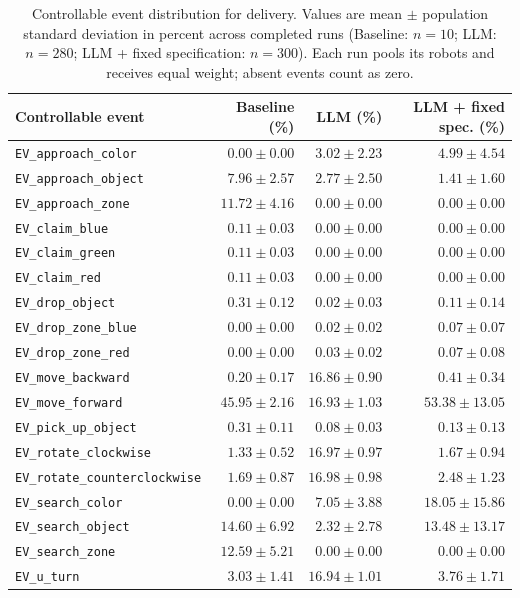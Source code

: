 \begin{table}[htbp]
\centering
\small
\caption{Controllable event distribution for delivery. Values are mean $\pm$ population standard deviation in percent across completed runs (Baseline: $n=10$; LLM: $n=280$; LLM + fixed specification: $n=300$). Each run pools its robots and receives equal weight; absent events count as zero.}
\label{tab:delivery-controllable-events}
\begin{tabular}{lrrr}
\hline
Controllable event & Baseline (\%) & LLM (\%) & LLM + fixed spec. (\%) \\
\hline
\texttt{EV\_approach\_color} & $0.00 \pm 0.00$ & $3.02 \pm 2.23$ & $4.99 \pm 4.54$ \\
\texttt{EV\_approach\_object} & $7.96 \pm 2.57$ & $2.77 \pm 2.50$ & $1.41 \pm 1.60$ \\
\texttt{EV\_approach\_zone} & $11.72 \pm 4.16$ & $0.00 \pm 0.00$ & $0.00 \pm 0.00$ \\
\texttt{EV\_claim\_blue} & $0.11 \pm 0.03$ & $0.00 \pm 0.00$ & $0.00 \pm 0.00$ \\
\texttt{EV\_claim\_green} & $0.11 \pm 0.03$ & $0.00 \pm 0.00$ & $0.00 \pm 0.00$ \\
\texttt{EV\_claim\_red} & $0.11 \pm 0.03$ & $0.00 \pm 0.00$ & $0.00 \pm 0.00$ \\
\texttt{EV\_drop\_object} & $0.31 \pm 0.12$ & $0.02 \pm 0.03$ & $0.11 \pm 0.14$ \\
\texttt{EV\_drop\_zone\_blue} & $0.00 \pm 0.00$ & $0.02 \pm 0.02$ & $0.07 \pm 0.07$ \\
\texttt{EV\_drop\_zone\_red} & $0.00 \pm 0.00$ & $0.03 \pm 0.02$ & $0.07 \pm 0.08$ \\
\texttt{EV\_move\_backward} & $0.20 \pm 0.17$ & $16.86 \pm 0.90$ & $0.41 \pm 0.34$ \\
\texttt{EV\_move\_forward} & $45.95 \pm 2.16$ & $16.93 \pm 1.03$ & $53.38 \pm 13.05$ \\
\texttt{EV\_pick\_up\_object} & $0.31 \pm 0.11$ & $0.08 \pm 0.03$ & $0.13 \pm 0.13$ \\
\texttt{EV\_rotate\_clockwise} & $1.33 \pm 0.52$ & $16.97 \pm 0.97$ & $1.67 \pm 0.94$ \\
\texttt{EV\_rotate\_counterclockwise} & $1.69 \pm 0.87$ & $16.98 \pm 0.98$ & $2.48 \pm 1.23$ \\
\texttt{EV\_search\_color} & $0.00 \pm 0.00$ & $7.05 \pm 3.88$ & $18.05 \pm 15.86$ \\
\texttt{EV\_search\_object} & $14.60 \pm 6.92$ & $2.32 \pm 2.78$ & $13.48 \pm 13.17$ \\
\texttt{EV\_search\_zone} & $12.59 \pm 5.21$ & $0.00 \pm 0.00$ & $0.00 \pm 0.00$ \\
\texttt{EV\_u\_turn} & $3.03 \pm 1.41$ & $16.94 \pm 1.01$ & $3.76 \pm 1.71$ \\
\hline
\end{tabular}
\end{table}
